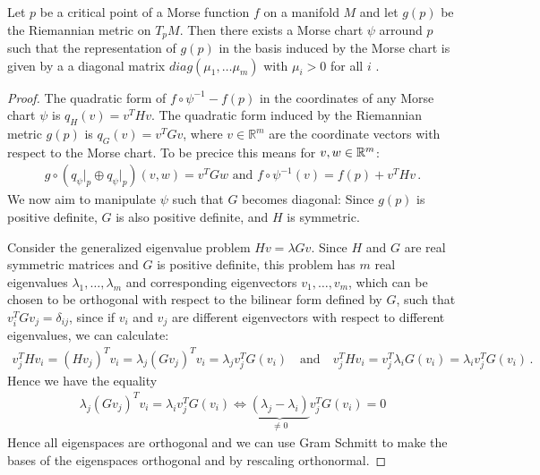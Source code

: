 \begin{theorem}\label{thm: Simultaneous Diagonalisation of Quadratic Forms}
	Let $p$ be a critical point of a Morse function $f$ on a manifold $M$ and let $g(p)$ be the Riemannian metric on $T_pM$. Then there exists a Morse chart $\psi$ arround $p$ such that the representation of $g(p)$ in the basis induced by the Morse chart is given by a a diagonal matrix $diag(\mu_1,\dots \mu_m)$ with $\mu_i>0$ for all $i$ .
\end{theorem}
\begin{proof}
	The quadratic form of $f \circ \psi^{-1} - f(p)$ in the coordinates of any Morse chart $\psi$ is $q_H(v) = v^T H v$. The quadratic form induced by the Riemannian metric $g(p)$ is $q_G(v) = v^T G v$, where $v \in \mathbb{R}^m$ are the coordinate vectors with respect to the Morse chart. 
	To be precice this means for $v,w\in \mathbb{R}^m$:
	\begin{align*}
		g\circ ( q_{\psi}\big|_p\oplus q_{\psi}\big|_p ) (v,w)=v^TG w \text{ and } f\circ \psi^{-1} (v)=f(p)+v^T H v \, .
	\end{align*} We now aim to manipulate $\psi$ such that $G$ becomes diagonal:
	Since $g(p)$ is positive definite, $G$ is also positive definite, and $H$ is symmetric.
	
	Consider the generalized eigenvalue problem $Hv = \lambda G v$. Since $H$ and $G$ are real symmetric matrices and $G$ is positive definite, this problem has $m$ real eigenvalues $\lambda_1, \dots, \lambda_m$ and corresponding eigenvectors $v_1, \dots, v_m$, which can be chosen to be orthogonal with respect to the bilinear form defined by $G$, such that $v_i^T G v_j = \delta_{ij}$, since if $v_i$ and $v_j$ are different eigenvectors with respect to different eigenvalues, we can calculate:
	\begin{align*}
		v_j^THv_i=(Hv_j)^Tv_i=\lambda _j(Gv_j)^Tv_i=\lambda _j v_j^T G(v_i)  \quad \text{and}\quad 	v_j^THv_i= v_j^T \lambda_i G(v_i)=\lambda_i v_j^TG(v_i) \, .
	\end{align*} Hence we have the equality
	\begin{align*}
		\lambda _j(Gv_j)^Tv_i=\lambda_i v_j^TG(v_i) \Leftrightarrow \underbrace{(\lambda_j-\lambda_i)}_{\neq 0}v_j^T G(v_i)=0
	\end{align*} Hence all eigenspaces are orthogonal and we can use Gram Schmitt to make the bases of the eigenspaces orthogonal and by rescaling orthonormal.
	

\end{proof}
